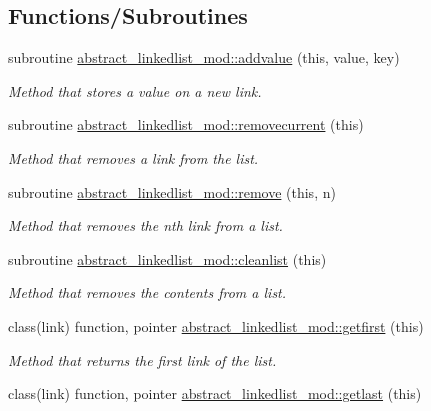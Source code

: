 \subsection*{Functions/\+Subroutines}
\begin{DoxyCompactItemize}
\item 
subroutine \mbox{\hyperlink{namespaceabstract__linkedlist__mod_a1075e2f234dacc9daf8407e14fac0929}{abstract\+\_\+linkedlist\+\_\+mod\+::addvalue}} (this, value, key)
\begin{DoxyCompactList}\small\item\em Method that stores a value on a new link. \end{DoxyCompactList}\item 
subroutine \mbox{\hyperlink{namespaceabstract__linkedlist__mod_ae725ed63dd3b08d29e1c4ff824e05589}{abstract\+\_\+linkedlist\+\_\+mod\+::removecurrent}} (this)
\begin{DoxyCompactList}\small\item\em Method that removes a link from the list. \end{DoxyCompactList}\item 
subroutine \mbox{\hyperlink{namespaceabstract__linkedlist__mod_a9f4028744d1ca6536e28c76d2795ace3}{abstract\+\_\+linkedlist\+\_\+mod\+::remove}} (this, n)
\begin{DoxyCompactList}\small\item\em Method that removes the nth link from a list. \end{DoxyCompactList}\item 
subroutine \mbox{\hyperlink{namespaceabstract__linkedlist__mod_a09300e2f8301965a7137cdd60a3b7ac7}{abstract\+\_\+linkedlist\+\_\+mod\+::cleanlist}} (this)
\begin{DoxyCompactList}\small\item\em Method that removes the contents from a list. \end{DoxyCompactList}\item 
class(link) function, pointer \mbox{\hyperlink{namespaceabstract__linkedlist__mod_ad7b7ffee891627ae2b0548001650f72b}{abstract\+\_\+linkedlist\+\_\+mod\+::getfirst}} (this)
\begin{DoxyCompactList}\small\item\em Method that returns the first link of the list. \end{DoxyCompactList}\item 
class(link) function, pointer \mbox{\hyperlink{namespaceabstract__linkedlist__mod_a7c0a2e5b554e8859fc9b4d8fb52b124f}{abstract\+\_\+linkedlist\+\_\+mod\+::getlast}} (this)

\end{DoxyCompactItemize}
